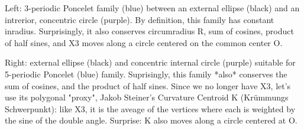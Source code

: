 Left: 3-periodic Poncelet family (blue) between an external ellipse (black) and an intrerior, concentric circle (purple). By definition, this family has constant inradius. Surprisingly, it also conserves circumradius R, sum of cosines, product of half sines, and X3 moves along a circle centered on the common center O.

Right: external ellipse (black) and concentric internal circle (purple) suitable for 5-periodic Poncelet (blue) family. Suprisingly, this family *also* conserves the sum of cosines, and the product of half sines. Since we no longer have X3, let's use its polygonal "proxy", Jakob Steiner's Curvature Centroid K (Krümmungs Schwerpunkt): like X3, it is the aveage of the vertices where each is weighted by the sine of the double angle. Surprise: K also moves along a circle centered at O.